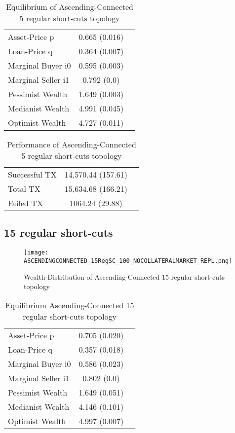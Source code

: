 \documentclass[Bachelorarbeit.tex]{subfiles}
\begin{document}
\begin{table}[H]
	\caption{Equilibrium of Ascending-Connected 5 regular short-cuts topology}
	\centering
	\begin{tabular} { l c r }
		\hline
		Asset-Price p & 0.665 (0.016) \\
		Loan-Price q & 0.364 (0.007) \\
		Marginal Buyer i0 & 0.595 (0.003) \\
		Marginal Seller i1 & 0.792 (0.0) \\
		\hline
		Pessimist Wealth & 1.649 (0.003) \\
		Medianist Wealth & 4.991 (0.045) \\
		Optimist Wealth & 4.727 (0.011) \\
		\hline
	\end{tabular}
\end{table} 

\begin{table}[H]
	\caption{Performance of Ascending-Connected 5 regular short-cuts topology}
	\centering
	\begin{tabular} { l c r }
		\hline
		Successful TX & 14,570.44 (157.61) \\
		Total TX & 15,634.68 (166.21) \\
		Failed TX & 1064.24 (29.88) \\
		\hline
	\end{tabular}
\end{table}

\subsection{15 regular short-cuts}
\begin{figure}[H]
	\centering
  \texttt{[image: ASCENDINGCONNECTED\_15RegSC\_100\_NOCOLLATERALMARKET\_REPL.png]}
	\caption{Wealth-Distribution of Ascending-Connected 15 regular short-cuts topology}
	\label{fig:wealth_ASCENDINGCONNECTED_15RegSC_100_NOCOLLATERALMARKET_REPL}
\end{figure}

\begin{table}[H]
	\caption{Equilibrium Ascending-Connected 15 regular short-cuts topology}
	\centering
	\begin{tabular} { l c r }
		\hline
		Asset-Price p & 0.705 (0.020) \\
		Loan-Price q & 0.357 (0.018) \\
		Marginal Buyer i0 & 0.586 (0.023) \\
		Marginal Seller i1 & 0.802 (0.0) \\
		\hline
		Pessimist Wealth & 1.649 (0.051) \\
		Medianist Wealth & 4.146 (0.101) \\
		Optimist Wealth & 4.997 (0.007) \\
		\hline
	\end{tabular}
\end{table} 
\end{document}
